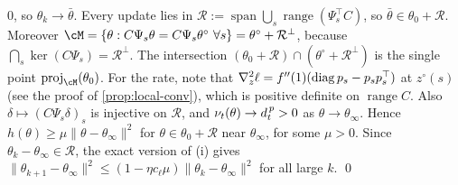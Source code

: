 $0$, so $\theta_k\to\bar\theta$. Every update lies in $\mathcal R:=\operatorname{span}\bigcup_s\operatorname{range}(\Psi_s^\top C)$, so $\bar\theta\in\theta_0+\mathcal R$. Moreover
$\cM=\{\theta:C\Psi_s\theta=C\Psi_s\theta^\circ\ \forall s\}=\theta^\circ+\mathcal R^\perp$, because $\bigcap_s\ker(C\Psi_s)=\mathcal R^\perp$. The intersection $(\theta_0+\mathcal R)\cap(\theta^\circ+\mathcal R^\perp)$
is the single point $\operatorname{proj}_\cM(\theta_0)$. For the rate, note that $\nabla^2_z\ell=f''(1)(\operatorname{diag} p_s-p_sp_s^\top)$ at $z^\circ(s)$ (see the proof of
\cref{prop:local-conv}), which is positive definite on $\operatorname{range}C$. Also $\delta\mapsto(C\Psi_s\delta)_s$ is injective on $\mathcal R$, and $\nu_t(\theta)\to d^{\,p}_{t}>0$
as $\theta\to\theta_\infty$. Hence $h(\theta)\ge\mu\|\theta-\theta_\infty\|^2$ for $\theta\in\theta_0+\mathcal R$ near $\theta_\infty$, for some $\mu>0$. Since $\theta_k-\theta_\infty\in\mathcal R$, the exact version
of (i) gives $\|\theta_{k+1}-\theta_\infty\|^2\le(1-\eta c_\ell\mu)\|\theta_k-\theta_\infty\|^2$ for all large $k$. \qed

